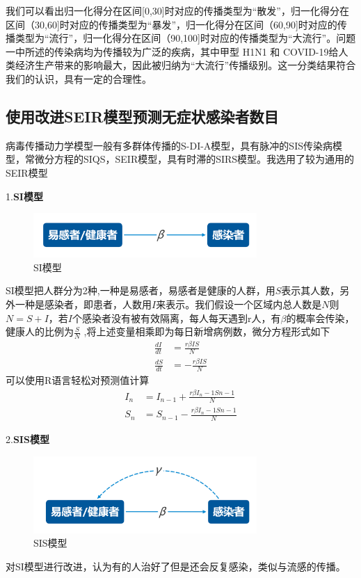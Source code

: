 \documentclass[a4paper, 11pt,twoside=true,UTF8]{scrartcl}
\begin{document}
我们可以看出归一化得分在区间[0,30]时对应的传播类型为“散发”，归一化得分在区间（30,60]时对应的传播类型为“暴发”，归一化得分在区间（60,90]时对应的传播类型为“流行”，归一化得分在区间（90,100]时对应的传播类型为“大流行”。问题一中所述的传染病均为传播较为广泛的疾病，其中甲型 H1N1 和 COVID-19给人类经济生产带来的影响最大，因此被归纳为“大流行”传播级别。这一分类结果符合我们的认识，具有一定的合理性。


\subsection{使用改进SEIR模型预测无症状感染者数目}
病毒传播动力学模型一般有多群体传播的S-DI-A模型，具有脉冲的SIS传染病模型，常微分方程的SIQS，SEIR模型，具有时滞的SIRS模型。我选用了较为通用的SEIR模型

1.\textbf{SI模型}
\begin{figure}[H]
	\small
	\centering
	\includegraphics[width=8.5cm]{C1}
	\caption{SI模型} \label{C1}
\end{figure}
SI模型把人群分为2种,一种是易感者，易感者是健康的人群，用$S$表示其人数，另外一种是感染者，即患者，人数用$I$来表示。我们假设一个区域内总人数是$N$则$N=S+I$，若$I$个感染者没有被有效隔离，每人每天遇到r人，有$\beta$的概率会传染，健康人的比例为$\frac {S}{N}$ ,将上述变量相乘即为每日新增病例数，微分方程形式如下
$$
\begin{aligned}
\frac{dI}{dt}&=\frac{r\beta IS}{N}    \\
\frac{dS}{dt}&=-\frac{r\beta IS}{N}
\end{aligned}
$$
可以使用R语言轻松对预测值计算
$$
\begin{aligned}
I_n&=I_{n-1}+\frac{r\beta {I_n}-1S{n-1}}{N}    \\
S_n&=S_{n-1}-\frac{r\beta {	I_n}-1S{n-1}}{N}
\end{aligned}
$$

2.\textbf{SIS模型}
\begin{figure}[H]
	\small
	\centering
	\includegraphics[width=8.5cm]{C2}
	\caption{SIS模型} \label{C2}
\end{figure}
对SI模型进行改进，认为有的人治好了但是还会反复感染，类似与流感的传播。
\end{document}
